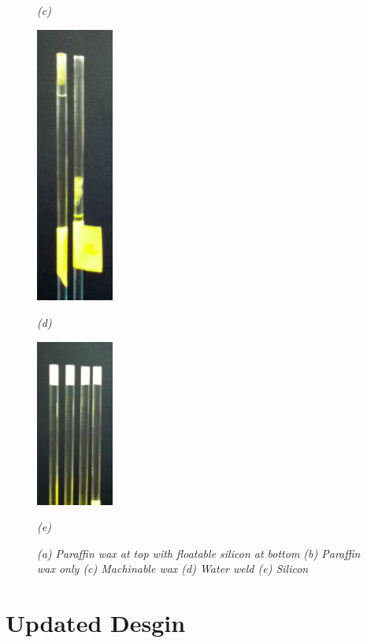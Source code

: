 \begin{figure}[htb]
\begin{minipage}[b]{1in}
    \centerline{\emph{(c)}}
  \end{minipage}
  \begin{minipage}[b]{1in}
    \centering
    \centerline{\mbox{\includegraphics[width=1in]{phantom/images/tube_sealings/water_weld.eps}}}
    \centerline{\emph{(d)}}
  \end{minipage}
  \begin{minipage}[b]{1in}
    \centering
    \centerline{\mbox{\includegraphics[width=1in]{phantom/images/tube_sealings/silicon.eps}}}
    \centerline{\emph{(e)}}
  \end{minipage}
  \caption{\emph{(a) Paraffin wax at top with floatable silicon at bottom (b) Paraffin wax only (c) Machinable wax (d) Water weld (e) Silicon}}
\end{figure}

\section{Updated Desgin}


